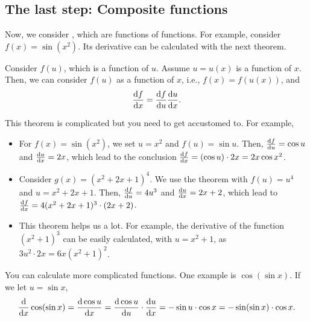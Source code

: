 \documentclass[11pt,pdfa,lastpage]{MishoNote}
\newif\ifBasicForm\BasicFormtrue
\begin{document}
\begin{problems}
\end{problems}

\ifBasicForm\pagebreak\else\fi

\subsection{The last step: Composite functions}
Now, we consider , which are functions of functions. For example, consider $f(x)=\sin(x^2)$. Its derivative can be calculated with the next theorem.
\begin{theorem}{}{}
  Consider $f(u)$, which is a function of $u$. Assume $u=u(x)$ is a function of $x$. Then, we can consider $f(u)$ as a function of $x$, i.e., $f(x)=f(u(x))$, and
  \begin{equation}
   \diff{f}{x}=\diff{f}{u}\diff{u}{x}.
  \end{equation}
\end{theorem}
\noindent
This theorem is complicated but you need to get accustomed to. For example,
  \begin{itemize}
    \item For $f(x)=\sin(x^2)$, we set $u=x^2$ and $f(u)=\sin u$. Then, $\diff fu=\cos u$ and $\diff ux=2x$, which lead to the conclusion $\diff fx=(\cos u)\cdot2x=2x\cos x^2$.
    \item Consider $g(x)=(x^2+2x+1)^4$. We use the theorem with $f(u)=u^4$ and $u=x^2+2x+1$. Then, $\diff fu=4u^3$ and $\diff ux=2x+2$, which lead to $\diff fx=4(x^2+2x+1)^3\cdot(2x+2)$.
    \\
    \item This theorem helps us a lot. For example, the derivative of the function $(x^2+1)^3$ can be easily calculated, with $u=x^2+1$, as $3u^2\cdot 2x=6x(x^2+1)^2$.
  \end{itemize}
You can calculate more complicated functions. One example is $\cos(\sin x)$. If we let $u=\sin x$,
  \[
  \diff{}{x}\cos(\sin x)=\diff{\cos{u}}{x}=\diff{\cos{u}}{u}\cdot\diff ux=-\sin u\cdot\cos x=-\sin(\sin x)\cdot\cos x.
  \]
\end{document}
